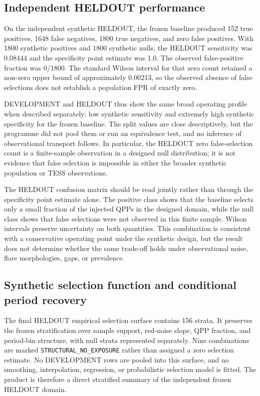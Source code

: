 \documentclass[11pt,a4paper]{article}
\begin{document}
\subsection{Independent HELDOUT performance}
On the independent synthetic HELDOUT, the frozen baseline produced 152 true positives, 1648 false negatives, 1800 true negatives, and zero false positives. With 1800 synthetic positives and 1800 synthetic nulls, the HELDOUT sensitivity was 0.08444 and the specificity point estimate was 1.0. The observed false-positive fraction was 0/1800. The standard Wilson interval for that zero count retained a non-zero upper bound of approximately 0.00213, so the observed absence of false selections does not establish a population FPR of exactly zero.

DEVELOPMENT and HELDOUT thus show the same broad operating profile when described separately: low synthetic sensitivity and extremely high synthetic specificity for the frozen baseline. The split values are close descriptively, but the programme did not pool them or run an equivalence test, and no inference of observational transport follows. In particular, the HELDOUT zero false-selection count is a finite-sample observation in a designed null distribution; it is not evidence that false selection is impossible in either the broader synthetic population or TESS observations.




The HELDOUT confusion matrix should be read jointly rather than through the specificity point estimate alone. The positive class shows that the baseline selects only a small fraction of the injected QPPs in the designed domain, while the null class shows that false selections were not observed in this finite sample. Wilson intervals preserve uncertainty on both quantities. This combination is consistent with a conservative operating point under the synthetic design, but the result does not determine whether the same trade-off holds under observational noise, flare morphologies, gaps, or prevalence.

\subsection{Synthetic selection function and conditional period recovery}
The final HELDOUT empirical selection surface contains 156 strata. It preserves the frozen stratification over sample support, red-noise slope, QPP fraction, and period-bin structure, with null strata represented separately. Nine combinations are marked \texttt{STRUCTURAL\_NO\_EXPOSURE} rather than assigned a zero selection estimate. No DEVELOPMENT rows are pooled into this surface, and no smoothing, interpolation, regression, or probabilistic selection model is fitted. The product is therefore a direct stratified summary of the independent frozen HELDOUT domain.
\end{document}
